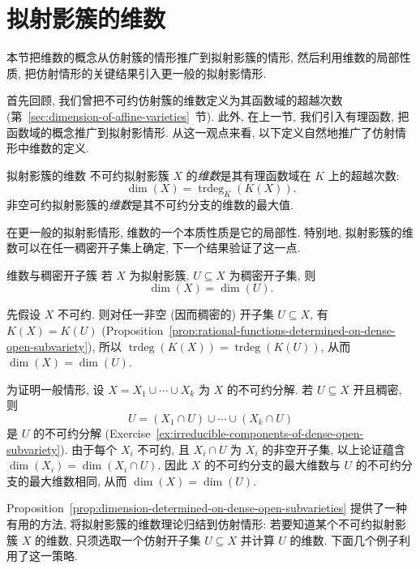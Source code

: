\section{拟射影簇的维数}\label{sec:dimension-of-quasiprojective-varieties}

本节把维数的概念从仿射簇的情形推广到拟射影簇的情形, 然后利用维数的局部性质, 把仿射情形的关键结果引入更一般的拟射影情形.

首先回顾, 我们曾把不可约仿射簇的维数定义为其函数域的超越次数 (第~\ref{sec:dimension-of-affine-varieties}~节). 此外, 在上一节, 我们引入有理函数, 把函数域的概念推广到拟射影情形. 从这一观点来看, 以下定义自然地推广了仿射情形中维数的定义.

\begin{Definition}{拟射影簇的维数}\leavevmode\label{def:dimension-of-quasiprojective-variety}
不可约拟射影簇 $X$ 的\emph{维数}是其有理函数域在 $K$ 上的超越次数:
\[
  \dim(X)=\operatorname{trdeg}_{K}(K(X)).
\]
非空可约拟射影簇的\emph{维数}是其不可约分支的维数的最大值.
\end{Definition}

在更一般的拟射影情形, 维数的一个本质性质是它的局部性. 特别地, 拟射影簇的维数可以在任一稠密开子集上确定, 下一个结果验证了这一点.

\begin{Proposition}{维数与稠密开子簇}\leavevmode\label{prop:dimension-determined-on-dense-open-subvarieties}
若 $X$ 为拟射影簇, $U\subseteq X$ 为稠密开子集, 则
\[
  \dim(X)=\dim(U).
\]
\end{Proposition}
\begin{Proof}
先假设 $X$ 不可约. 则对任一非空 (因而稠密的) 开子集 $U\subseteq X$, 有 $K(X)=K(U)$ (Proposition~\ref{prop:rational-functions-determined-on-dense-open-subvariety}), 所以 $\operatorname{trdeg}(K(X))=\operatorname{trdeg}(K(U))$, 从而 $\dim(X)=\dim(U)$.

为证明一般情形, 设 $X=X_{1}\cup\cdots\cup X_{k}$ 为 $X$ 的不可约分解. 若 $U\subseteq X$ 开且稠密, 则
\[
  U=(X_{1}\cap U)\cup\cdots\cup(X_{k}\cap U)
\]
是 $U$ 的不可约分解 (Exercise~\ref{ex:irreducible-components-of-dense-open-subvariety}). 由于每个 $X_{i}$ 不可约, 且 $X_{i}\cap U$ 为 $X_{i}$ 的非空开子集, 以上论证蕴含 $\dim(X_{i})=\dim(X_{i}\cap U)$. 因此 $X$ 的不可约分支的最大维数与 $U$ 的不可约分支的最大维数相同, 从而 $\dim(X)=\dim(U)$.
\end{Proof}

Proposition~\ref{prop:dimension-determined-on-dense-open-subvarieties} 提供了一种有用的方法, 将拟射影簇的维数理论归结到仿射情形: 若要知道某个不可约拟射影簇 $X$ 的维数, 只须选取一个仿射开子集 $U\subseteq X$ 并计算 $U$ 的维数. 下面几个例子利用了这一策略.

